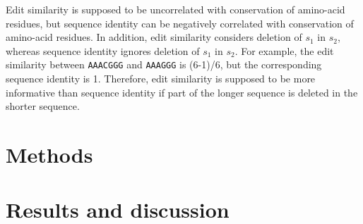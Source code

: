 \documentclass[]{article}
\begin{document}
Edit similarity is supposed to be uncorrelated with conservation of amino-acid residues, but sequence identity can be negatively correlated with conservation of amino-acid residues.
In addition, edit similarity considers deletion of \(s_1\) in \(s_2\), whereas sequence identity ignores deletion of \(s_1\) in \(s_2\).
For example, the edit similarity between \texttt{AAACGGG} and \texttt{AAAGGG} is (6-1)/6, but the corresponding sequence identity is 1. Therefore, edit similarity is supposed to be more informative than sequence identity if part of the longer sequence is deleted in the shorter sequence.

\section{Methods}

\fi

\section{Results and discussion}
\end{document}
